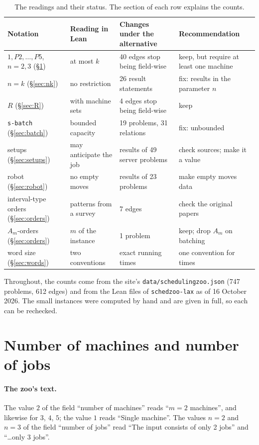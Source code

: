 \documentclass[11pt]{article}
\theoremstyle{definition}
\begin{document}
\begin{table}[ht]
\centering\small
\renewcommand{\arraystretch}{1.1}
\begin{tabularx}{\textwidth}{>{\raggedright}p{2.5cm}>{\raggedright}p{3.1cm}>{\raggedright}X>{\raggedright\arraybackslash}p{2.7cm}}
\toprule
Notation & Reading in Lean & Changes under the alternative & Recommendation\\
\midrule
$1, P2, \dots, P5$, $n=2,3$ (\S\ref{sec:counts}) & at most $k$ & 40 edges stop being field-wise & keep, but require at least one machine\\
$n=k$ (\S\ref{sec:nk}) & no restriction & 26 result statements & fix: results in the parameter $n$\\
$R$ (\S\ref{sec:R}) & with machine sets & 4 edges stop being field-wise & keep\\
\texttt{s-batch} (\S\ref{sec:batch}) & bounded capacity & 19 problems, 31 relations & fix: unbounded\\
setups (\S\ref{sec:setups}) & may anticipate the job & results of 49 server problems & check sources; make it a value\\
robot (\S\ref{sec:robot}) & no empty moves & results of 23 problems & make empty moves data\\
interval-type orders (\S\ref{sec:orders}) & patterns from a survey & 7 edges & check the original papers\\
$A_m$-orders (\S\ref{sec:orders}) & $m$ of the instance & 1 problem & keep; drop $A_m$ on batching\\
word size (\S\ref{sec:words}) & two conventions & exact running times & one convention for times\\
\bottomrule
\end{tabularx}
\caption{The readings and their status. The section of each row explains the
counts.}
\label{tab:overview}
\end{table}

Throughout, the counts come from the site's \texttt{data/schedulingzoo.json}
(747 problems, 612 edges) and from the Lean files of \texttt{schedzoo-lax} as of
16 October 2026. The small instances were computed by hand and are given
in full, so each can be rechecked.

\section{Number of machines and number of jobs}\label{sec:counts}

\paragraph{The zoo's text.} The value $2$ of the field ``number of machines''
reads ``$m=2$ machines'', and likewise for $3$, $4$, $5$; the value $1$ reads
``Single machine''. The values $n=2$ and $n=3$ of the field ``number of jobs''
read ``The input consists of only 2 jobs'' and ``\dots only 3 jobs''.
\end{document}
